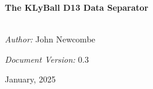 \begin{titlepage}
\vbox{ }

\vbox{ }

\begin{center}

\\[1cm]

\textsc{\Large }\\[0.5cm]

\vbox{ }

\HRule \\[0.4cm]
{ \huge \bfseries The KLyBall D13 Data Separator}
\\[0cm]
\HRule \\[1.0cm]

\begin{minipage}{0.4\textwidth}
\begin{flushleft} \large
\emph{Author:}
John Newcombe
\end{flushleft}
\end{minipage}
\begin{minipage}{0.4\textwidth}
\begin{flushright} \large
\emph{Document Version:} 0.3
\end{flushright}
\end{minipage}
\vfill

{\large January, 2025}
\end{center}
\end{titlepage}